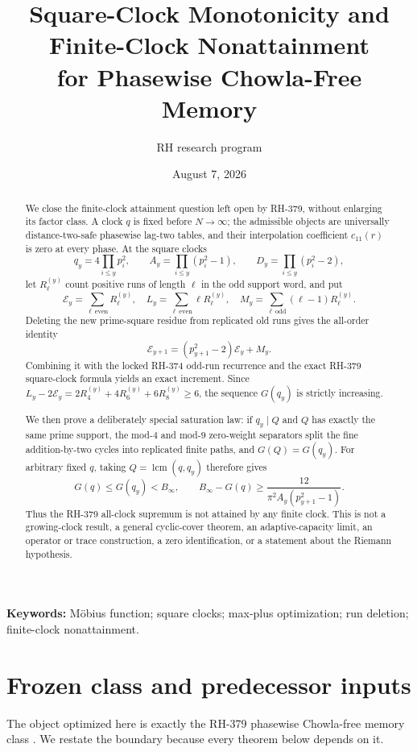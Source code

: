 \documentclass[11pt]{article}
\title{Square-Clock Monotonicity and Finite-Clock Nonattainment\\
for Phasewise Chowla-Free Memory}
\author{RH research program}
\date{August 7, 2026}
\theoremstyle{definition}
\theoremstyle{remark}
\newcommand{\Ecal}{\mathcal E}
\begin{document}
\maketitle

\begin{abstract}
We close the finite-clock attainment question left open by RH-379, without
enlarging its factor class.  A clock $q$ is fixed before $N\to\infty$; the
admissible objects are universally distance-two-safe phasewise lag-two
tables, and their interpolation coefficient $c_{11}(r)$ is zero at every
phase.  At the square clocks
\[
 q_y=4\prod_{i\le y}p_i^2,
 \qquad A_y=\prod_{i\le y}(p_i^2-1),
 \qquad D_y=\prod_{i\le y}(p_i^2-2),
\]
let $R_\ell^{(y)}$ count positive runs of length $\ell$ in the odd support
word, and put
\[
 \Ecal_y=\sum_{\ell\ \mathrm{even}}R_\ell^{(y)},\quad
 L_y=\sum_{\ell\ \mathrm{even}}\ell R_\ell^{(y)},\quad
 M_y=\sum_{\ell\ \mathrm{odd}}(\ell-1)R_\ell^{(y)}.
\]
Deleting the new prime-square residue from replicated old runs gives the
all-order identity
\[
 \Ecal_{y+1}=(p_{y+1}^2-2)\Ecal_y+M_y.
\]
Combining it with the locked RH-374 odd-run recurrence and the exact RH-379
square-clock formula yields an exact increment.  Since
$L_y-2\Ecal_y=2R_4^{(y)}+4R_6^{(y)}+6R_8^{(y)}\ge6$, the sequence $G(q_y)$
is strictly increasing.

We then prove a deliberately special saturation law: if $q_y\mid Q$ and
$Q$ has exactly the same prime support, the mod-$4$ and mod-$9$ zero-weight
separators split the fine addition-by-two cycles into replicated finite
paths, and $G(Q)=G(q_y)$.  For arbitrary fixed $q$, taking
$Q=\operatorname{lcm}(q,q_y)$ therefore gives
\[
 G(q)\le G(q_y)<B_\infty,
 \qquad
 B_\infty-G(q)\ge
 \frac{12}{\pi^2A_y(p_{y+1}^2-1)}.
\]
Thus the RH-379 all-clock supremum is not attained by any finite clock.
This is not a growing-clock result, a general cyclic-cover theorem, an
adaptive-capacity limit, an operator or trace construction, a zero
identification, or a statement about the Riemann hypothesis.
\end{abstract}

\noindent\textbf{Keywords:} M\"obius function; square clocks; max-plus
optimization; run deletion; finite-clock nonattainment.

\section{Frozen class and predecessor inputs}

The object optimized here is exactly the RH-379 phasewise Chowla-free
memory class \cite{RH379}.  We restate the boundary because every theorem
below depends on it.
\end{document}
